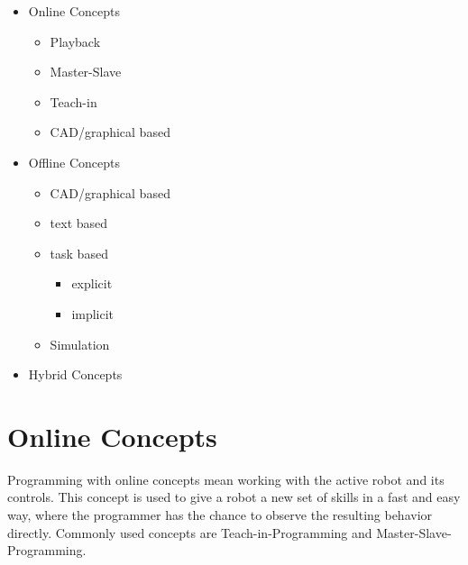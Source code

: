 \documentclass[conference]{IEEEtran}
\begin{document}
 \begin{itemize}
    \item Online Concepts
        \begin{itemize}
            \item Playback
            \item Master-Slave
            \item Teach-in
            \item CAD/graphical based
        \end{itemize}
    \item Offline Concepts
        \begin{itemize}
            \item CAD/graphical based
            \item text based
            \item task based
                \begin{itemize}
                    \item explicit
                    \item implicit
                \end{itemize}
            \item Simulation
        \end{itemize}
    \item Hybrid Concepts
 \end{itemize}    

\section{Online Concepts}

Programming with online concepts mean working with the active robot and its controls. %
This concept is used to give a robot a new set of skills in a fast and easy way, where the programmer has the chance to observe the resulting behavior directly. %
Commonly used concepts are Teach-in-Programming and Master-Slave-Programming.

\end{document}
